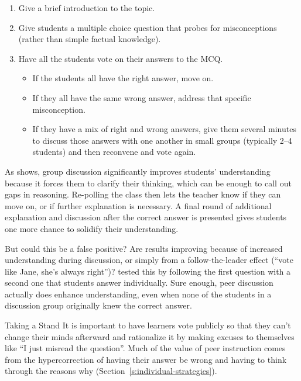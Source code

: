 \begin{enumerate}
\item
  Give a brief introduction to the topic.
\item
  Give students a multiple choice question that probes for
  misconceptions (rather than simple factual knowledge).
\item
  Have all the students vote on their answers to the MCQ.

  \begin{itemize}
  \item
    If the students all have the right answer, move on.
  \item
    If they all have the same wrong answer, address that specific
    misconception.
  \item
    If they have a mix of right and wrong answers, give them several
    minutes to discuss those answers with one another in small
    groups (typically 2--4 students) and then reconvene and vote
    again.
  \end{itemize}
\end{enumerate}

As  shows, group discussion significantly
improves students' understanding because it forces them to clarify
their thinking, which can be enough to call out gaps in
reasoning. Re-polling the class then lets the teacher know if they can
move on, or if further explanation is necessary. A final round of
additional explanation and discussion after the correct answer is
presented gives students one more chance to solidify their
understanding.

But could this be a false positive? Are results improving because of
increased understanding during discussion, or simply from a
follow-the-leader effect (``vote like Jane, she's always right'')?
\cite{Smit2009} tested this by following the first question with a
second one that students answer individually. Sure enough, peer
discussion actually does enhance understanding, even when none of the
students in a discussion group originally knew the correct answer.

\begin{aside}{Taking a Stand}
  It is important to have learners vote publicly so that they can't
  change their minds afterward and rationalize it by making excuses to
  themselves like ``I just misread the question''. Much of the value of
  peer instruction comes from the hypercorrection of having their answer
  be wrong and having to think through the reasons why
  (Section~\ref{s:individual-strategies}).
\end{aside}


